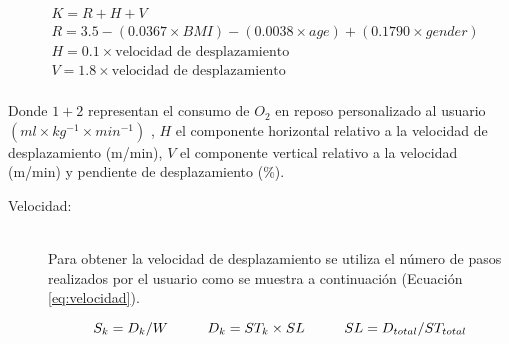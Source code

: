 \begin{equation} \label{eq:demandaOxigeno_personalizada}
\begin{split} 
& K = R + H + V \\ 
& R = 3.5 - (0.0367 \times BMI) - (0.0038 \times age) + (0.1790 \times gender)\\
& H = 0.1 \times \textrm{velocidad de desplazamiento}\\ 
& V = 1.8 \times \textrm{velocidad de desplazamiento}\\ 
\end{split} 
\end{equation} 

Donde $1 + 2$ representan el consumo de $O_{2}$ en reposo personalizado al usuario $(ml \times kg^{-1} \times min^{-1})$ \citep{Barstow:1991}, $H$ el componente horizontal relativo a la velocidad de desplazamiento (m/min), $V$ el componente vertical relativo a la velocidad (m/min) y pendiente de desplazamiento (\%).

\begin{description}
  \item[Velocidad:] \hfill \\
  	Para obtener la velocidad de desplazamiento se utiliza el número de pasos realizados por el usuario como se muestra a continuación (Ecuación \ref{eq:velocidad}).
  
\begin{equation} \label{eq:velocidad}
  S_{k} = D_{k}/W \hspace{10 mm} 
  D_{k} = ST_{k} \times SL \hspace{10 mm}
  SL = D_{total}/ST_{total} 
\end{equation}

\end{description}
	
\newpage

